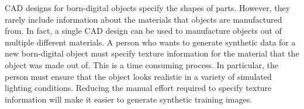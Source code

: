 CAD designs for born-digital objects specify the shapes of parts.
However, they rarely include information about the materials that objects are
manufactured from.
In fact, a single CAD design can be used to manufacture objects out of multiple
different materials.
A person who wants to generate synthetic data for a new born-digital object must
specify texture information for the material that the object was made out of.
This is a time consuming process.
In particular, the person must ensure that the object looks realistic in a
variety of simulated lighting conditions.
Reducing the manual effort required to specify texture information will make it
easier to generate synthetic training images.
